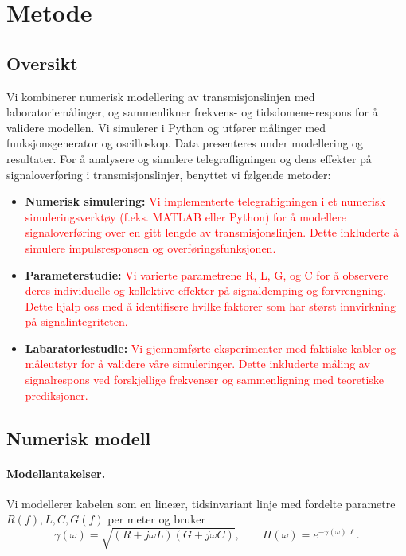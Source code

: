 \section{Metode}

\subsection{Oversikt}
Vi kombinerer numerisk modellering av transmisjonslinjen med laboratoriemålinger, og sammenlikner frekvens- og tidsdomene-respons for å validere modellen. Vi simulerer i Python og utfører målinger med funksjonsgenerator og oscilloskop. Data presenteres under modellering og resultater. For å analysere og simulere telegrafligningen og dens effekter på signaloverføring i transmisjonslinjer, benyttet vi følgende metoder: \\


\begin{itemize}
    \item \textbf{Numerisk simulering:} \textcolor{red}{Vi implementerte telegrafligningen i et numerisk simuleringsverktøy (f.eks. MATLAB eller Python) for å modellere signaloverføring over en gitt lengde av transmisjonslinjen. Dette inkluderte å simulere impulsresponsen og overføringsfunksjonen.}
    \item \textbf{Parameterstudie:} \textcolor{red}{Vi varierte parametrene R, L, G, og C for å observere deres individuelle og kollektive effekter på signaldemping og forvrengning. Dette hjalp oss med å identifisere hvilke faktorer som har størst innvirkning på signalintegriteten.}
    \item \textbf{Labaratoriestudie:}\textcolor{red}{ Vi gjennomførte eksperimenter med faktiske kabler og måleutstyr for å validere våre simuleringer. Dette inkluderte måling av signalrespons ved forskjellige frekvenser og sammenligning med teoretiske prediksjoner.}
\end{itemize}

\subsection{Numerisk modell}
\paragraph{Modellantakelser.}
Vi modellerer kabelen som en lineær, tidsinvariant linje med fordelte parametre $R(f),L,C,G(f)$ per meter og bruker
\[
\gamma(\omega)=\sqrt{(R+j\omega L)(G+j\omega C)},\qquad
H(\omega)=e^{-\gamma(\omega)\,\ell}.
\]

